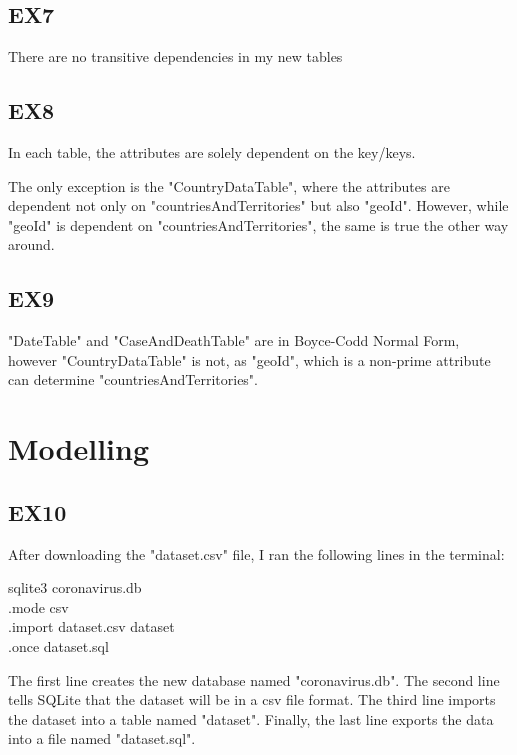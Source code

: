\documentclass{article}
\begin{document}
\subsection{EX7}
There are no transitive dependencies in my new tables

\subsection{EX8}
In each table, the attributes are solely dependent on the key/keys. \par
The only exception is the "CountryDataTable", where the attributes are dependent not only on "countriesAndTerritories" but also "geoId". However, while "geoId" is dependent on "countriesAndTerritories", the same is true the other way around.

\subsection{EX9}
"DateTable" and "CaseAndDeathTable" are in Boyce-Codd Normal Form, however "CountryDataTable" is not, as "geoId", which is a non-prime attribute can determine "countriesAndTerritories".

\section{Modelling}
\subsection{EX10}
After downloading the "dataset.csv" file, I ran the following lines in the terminal:
\begin{algorithm}
sqlite3 coronavirus.db \\
.mode csv \\
.import dataset.csv dataset \\
.once dataset.sql
\end{algorithm} \par
The first line creates the new database named "coronavirus.db". The second line tells SQLite that the dataset will be in a csv file format. The third line imports the dataset into a table named "dataset". Finally, the last line exports the data into a file named "dataset.sql".
\end{document}
